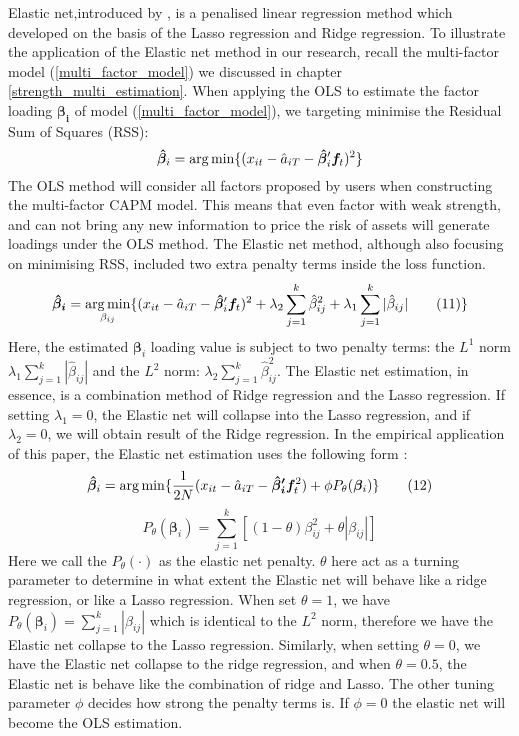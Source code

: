 Elastic net,introduced by ,  is a penalised linear regression method which developed on the basis of the Lasso regression \cite{Tibshirani1996} and Ridge regression.
To illustrate the application of the Elastic net method in our research, recall the multi-factor model (\ref{multi_factor_model}) we discussed in chapter \ref{strength_multi_estimation}.
When applying the OLS to estimate the factor loading $\bm{\beta_{i}}$ of model (\ref{multi_factor_model}), we targeting minimise the Residual Sum of Squares (RSS):
\[  \bm{\hat{\beta}}_i =   \operatorname*{arg\,min}\{  (x_{it} - \hat{a}_{iT} - \bm{\hat{\beta}}_i^{\prime}\bm{f}_t )^2 \}    \]
The OLS method will consider all factors proposed by users when constructing the multi-factor CAPM model.
This means that even factor with weak strength, and can not bring any new information to price the risk of assets will generate loadings under the OLS method.
The Elastic net method, although also focusing on minimising RSS, included two extra penalty terms inside the loss function.
\[   \bm{\hat{\beta}_{i}}  = \operatorname*{arg\,min}_{\beta_{ij}}\{ (x_{it} - \hat{a}_{iT} - \bm{\hat{\beta}}_{i} ^{\prime}\bm{f}_{t})^2 + \lambda_2\sum_{j = 1}^k\hat{\beta}_{ij}^2  + \lambda_1\sum_{j=1}^k|\hat{\beta}_{ij}|  \label{ENcriterion} \tag{11}   \}    \]
Here, the estimated $\bm{\beta}_i$ loading value is subject to two penalty terms: the $L^1$ norm $\lambda_1\sum_{j=1}^k|\hat{\beta}_{ij}|$ and the $L^2$ norm: $\lambda_2\sum_{j = 1}^k\hat{\beta}_{ij}^2$.
The Elastic net estimation, in essence, is a combination method of Ridge regression and the Lasso regression.
If setting $\lambda_1 = 0$, the Elastic net will collapse into the Lasso regression, and if $\lambda_2 = 0$, we will obtain result of the Ridge regression.
In the empirical application of this paper, the Elastic net estimation uses the following form \cite{Friedman2010}:
\[		\bm{\hat{\beta}}_{i} = \operatorname*{arg\,min}\{ \frac{1}{2N} (x_{it}-\hat{a}_{iT} - \bm{\hat{\beta}_{i}^{\prime}}\bm{f}_t ^2 ) +\phi P_{\theta}(\bm{\beta}_i)  \} \label{EN:empirical_formula}\tag{12} \]
\[	P_{\theta}(\bm{\beta}_i) =\sum_{j=1}^k [ (1-\theta)\beta_{ij}^2 + \theta |\beta_{ij}|] \label{EN:elastic_net_penalty} \tag{13}\]
Here we call the $P_{\theta}(\cdot)$ as the elastic net penalty.
$\theta$ here act as a turning parameter to determine in what extent the Elastic net will behave like a ridge regression, or like a Lasso regression.
When set $\theta = 1$, we have $P_{\theta}(\bm{\beta}_i) =\sum_{j=1}^k  |\beta_{ij}|$ which is identical to the $L^2$ norm, therefore we have the Elastic net collapse to the Lasso regression.
Similarly, when setting $\theta = 0$, we have the Elastic net collapse to the ridge regression, and when $\theta = 0.5$, the Elastic net is behave like the combination of ridge and Lasso.
The other tuning parameter $\phi$ decides how strong the penalty terms is.
If $\phi = 0$ the elastic net will become the OLS estimation.

